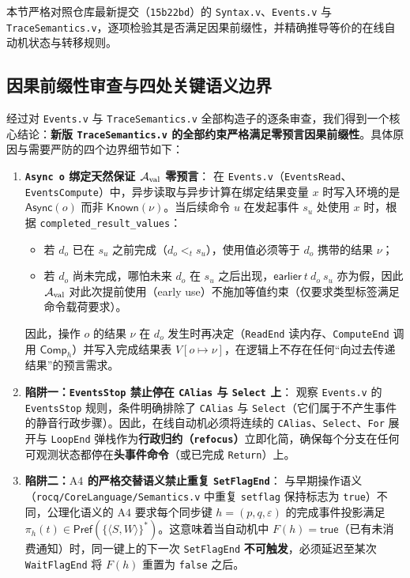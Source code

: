 \documentclass[UTF8,a4paper,11pt,fontset=fandol]{ctexart}
\newcommand{\code}[1]{\texttt{#1}}
\newcommand{\pathcode}[1]{\nolinkurl{#1}}
\newcommand{\kw}[1]{\mathsf{#1}}
\newcommand{\seq}[1]{\langle #1\rangle}
\begin{document}
本节严格对照仓库最新提交（\code{15b22bd}）的 \code{Syntax.v}、\code{Events.v} 与 \code{TraceSemantics.v}，逐项检验其是否满足因果前缀性，并精确推导等价的在线自动机状态与转移规则。

\subsection{因果前缀性审查与四处关键语义边界}

经过对 \code{Events.v} 与 \code{TraceSemantics.v} 全部构造子的逐条审查，我们得到一个核心结论：\textbf{新版 \code{TraceSemantics.v} 的全部约束严格满足零预言因果前缀性}。具体原因与需要严防的四个边界细节如下：

\begin{enumerate}
\item \textbf{\code{Async o} 绑定天然保证 $\mathcal A_{\rm val}$ 零预言}：
  在 \code{Events.v}（\code{EventsRead}、\code{EventsCompute}）中，异步读取与异步计算在绑定结果变量 $x$ 时写入环境的是 $\kw{Async}(o)$ 而非 $\kw{Known}(\nu)$。当后续命令 $u$ 在发起事件 $s_u$ 处使用 $x$ 时，根据 \code{completed\_result\_values}：
  \begin{itemize}
  \item 若 $d_o$ 已在 $s_u$ 之前完成（$d_o <_t s_u$），使用值必须等于 $d_o$ 携带的结果 $\nu$；
  \item 若 $d_o$ 尚未完成，哪怕未来 $d_o$ 在 $s_u$ 之后出现，$\kw{earlier}\ t\ d_o\ s_u$ 亦为假，因此 $\mathcal A_{\rm val}$ 对此次提前使用（early use）不施加等值约束（仅要求类型标签满足命令载荷要求）。
  \end{itemize}
  因此，操作 $o$ 的结果 $\nu$ 在 $d_o$ 发生时再决定（\code{ReadEnd} 读内存、\code{ComputeEnd} 调用 $\mathsf{Comp}_h$）并写入完成结果表 $V[o \mapsto \nu]$，在逻辑上不存在任何“向过去传递结果”的预言需求。

\item \textbf{陷阱一：\code{EventsStop} 禁止停在 \code{CAlias} 与 \code{Select} 上}：
  观察 \code{Events.v} 的 \code{EventsStop} 规则，条件明确排除了 \code{CAlias} 与 \code{Select}（它们属于不产生事件的静音行政步骤）。因此，在线自动机必须将连续的 \code{CAlias}、\code{Select}、\code{For} 展开与 \code{LoopEnd} 弹栈作为\textbf{行政归约（\code{refocus}）}立即化简，确保每个分支在任何可观测状态都停在\textbf{头事件命令}（或已完成 \code{Return}）上。

\item \textbf{陷阱二：$\mathrm{A4}$ 的严格交替语义禁止重复 \code{SetFlagEnd}}：
  与早期操作语义（\pathcode{rocq/CoreLanguage/Semantics.v} 中重复 \code{setflag} 保持标志为 \code{true}）不同，公理化语义的 $\mathrm{A4}$ 要求每个同步键 $h=(p,q,\varepsilon)$ 的完成事件投影满足 $\pi_h(t) \in \mathsf{Pref}(\{\seq{S,W}\}^*)$。这意味着当自动机中 $F(h) = \kw{true}$（已有未消费通知）时，同一键上的下一次 \code{SetFlagEnd} \textbf{不可触发}，必须延迟至某次 \code{WaitFlagEnd} 将 $F(h)$ 重置为 \code{false} 之后。


\end{enumerate}
\end{document}
